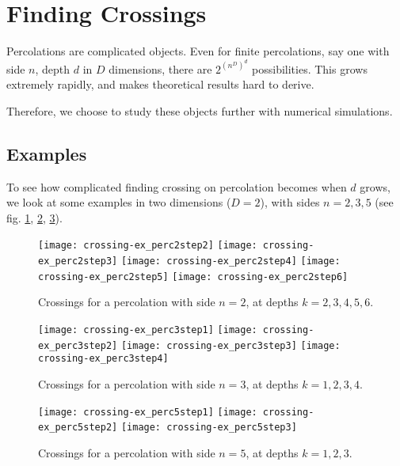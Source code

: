 \section{Finding Crossings}
Percolations are complicated objects.
Even for finite percolations, say one with side $n$, depth $d$ in $D$ dimensions, there are $2^{\left( n^D \right)^d}$ possibilities.
This grows extremely rapidly, and makes theoretical results hard to derive.

Therefore, we choose to study these objects further with numerical simulations.

\subsection{Examples}
To see how complicated finding crossing on percolation becomes when $d$ grows, we look at some examples in two dimensions ($D=2$), with sides $n=2,3,5$ (see fig. \ref{fig:crossingExPerc2}, \ref{fig:crossingExPerc3}, \ref{fig:crossingExPerc5}).
\begin{figure}[!h]
	\texttt{[image: crossing-ex\_perc2step2]}
	\hspace{0.1cm}
	\texttt{[image: crossing-ex\_perc2step3]}
	\hspace{0.1cm}
	\texttt{[image: crossing-ex\_perc2step4]}
	\hspace{0.1cm}
	\texttt{[image: crossing-ex\_perc2step5]}
	\hspace{0.1cm}
	\texttt{[image: crossing-ex\_perc2step6]}
	\centering
	\caption{Crossings for a percolation with side $n=2$, at depths $k=2,3,4,5,6$.}
	\label{fig:crossingExPerc2}
\end{figure}
\begin{figure}[!h]
	\texttt{[image: crossing-ex\_perc3step1]}
	\hspace{0.1cm}
	\texttt{[image: crossing-ex\_perc3step2]}
	\hspace{0.1cm}
	\texttt{[image: crossing-ex\_perc3step3]}
	\hspace{0.1cm}
	\texttt{[image: crossing-ex\_perc3step4]}
	\centering
	\caption{Crossings for a percolation with side $n=3$, at depths $k=1,2,3,4$.}
	\label{fig:crossingExPerc3}
\end{figure}
\begin{figure}[!h]
	\texttt{[image: crossing-ex\_perc5step1]}
	\hspace{0.9cm}
	\texttt{[image: crossing-ex\_perc5step2]}
	\hspace{0.9cm}
	\texttt{[image: crossing-ex\_perc5step3]}
	\centering
	\caption{Crossings for a percolation with side $n=5$, at depths $k=1,2,3$.}
	\label{fig:crossingExPerc5}
\end{figure}

